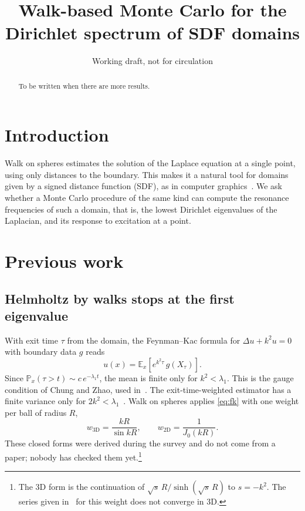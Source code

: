 \documentclass{article}
\title{Walk-based Monte Carlo for the Dirichlet spectrum of SDF domains}
\author{Working draft, not for circulation}
\begin{document}
\maketitle

\begin{abstract}
To be written when there are more results.
\end{abstract}

\section{Introduction}
\label{sec:intro}
Walk on spheres estimates the solution of the Laplace equation at a single point, using only distances to the boundary. This makes it a natural tool for domains given by a signed distance function (SDF), as in computer graphics~\cite{sawhney2025}. We ask whether a Monte Carlo procedure of the same kind can compute the resonance frequencies of such a domain, that is, the lowest Dirichlet eigenvalues of the Laplacian, and its response to excitation at a point.

\section{Previous work}

\subsection{Helmholtz by walks stops at the first eigenvalue}
\label{sec:barrier}
With exit time $\tau$ from the domain, the Feynman--Kac formula for $\Delta u+k^2u=0$ with boundary data $g$ reads
\begin{equation}
u(x)=\mathbb E_x\!\left[e^{k^2\tau}\,g(X_\tau)\right].
\label{eq:fk}
\end{equation}
Since $\mathbb P_x(\tau>t)\sim c\,e^{-\lambda_1 t}$, the mean is finite only for $k^2<\lambda_1$. This is the gauge condition of Chung and Zhao, used in~\cite{yang2015,rasila2026}. The exit-time-weighted estimator has a finite variance only for $2k^2<\lambda_1$~\cite{rasila2026}. Walk on spheres applies \eqref{eq:fk} with one weight per ball of radius $R$,
\begin{equation}
w_{3\mathrm D}=\frac{kR}{\sin kR},\qquad w_{2\mathrm D}=\frac{1}{J_0(kR)}.
\label{eq:weights}
\end{equation}
These closed forms were derived during the survey and do not come from a paper; nobody has checked them yet.\footnote{The 3D form is the continuation of $\sqrt{s}\,R/\sinh(\sqrt{s}\,R)$ to $s=-k^2$. The series given in~\cite{yang2015} for this weight does not converge in 3D.}
\end{document}
